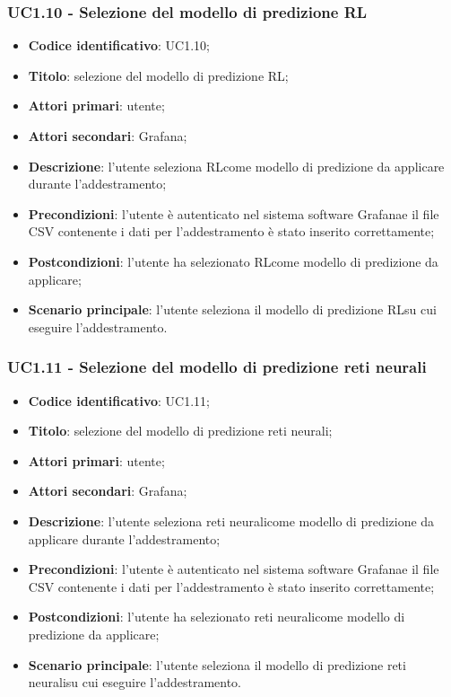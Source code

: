 \subsubsection{UC1.10 - Selezione del modello di predizione RL}
\begin{itemize}
	\item \textbf{Codice identificativo}: UC1.10;
	\item \textbf{Titolo}: selezione del modello di predizione RL\glo;
	\item \textbf{Attori primari}: utente;
	\item \textbf{Attori secondari}: Grafana\glo;
	\item \textbf{Descrizione}: l'utente seleziona RL\glosp come modello di predizione da applicare durante l'addestramento;
	\item \textbf{Precondizioni}: l'utente è autenticato nel sistema software Grafana\glosp e il file CSV contenente i dati per l'addestramento è stato inserito correttamente;
	\item \textbf{Postcondizioni}: l'utente ha selezionato RL\glosp come modello di predizione da applicare;
	\item \textbf{Scenario principale}: l'utente seleziona il modello di predizione RL\glosp su cui eseguire l'addestramento.
\end{itemize}
\subsubsection{UC1.11 - Selezione del modello di predizione reti neurali}
\begin{itemize}
	\item \textbf{Codice identificativo}: UC1.11;
	\item \textbf{Titolo}: selezione del modello di predizione reti neurali\glo;
	\item \textbf{Attori primari}: utente;
	\item \textbf{Attori secondari}: Grafana\glo;
	\item \textbf{Descrizione}: l'utente seleziona reti neurali\glosp come modello di predizione da applicare durante l'addestramento;
	\item \textbf{Precondizioni}: l'utente è autenticato nel sistema software Grafana\glosp e il file CSV contenente i dati per l'addestramento è stato inserito correttamente;
	\item \textbf{Postcondizioni}: l'utente ha selezionato reti neurali\glosp come modello di predizione da applicare;
	\item \textbf{Scenario principale}: l'utente seleziona il modello di predizione reti neurali\glosp su cui eseguire l'addestramento.
\end{itemize}
